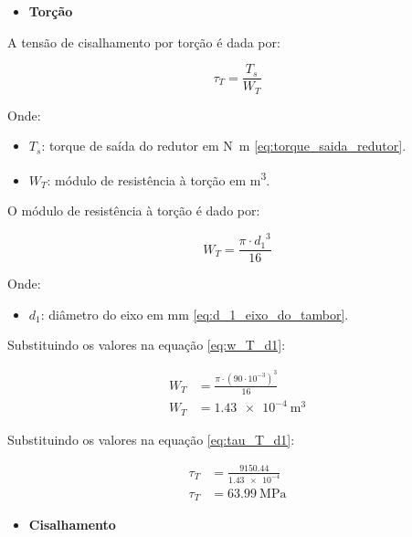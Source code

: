 \begin{itemize}
  \item \textbf{Torção}
\end{itemize}

A tensão de cisalhamento por torção é dada por:

\begin{equation}
  \tau_T = \frac{T_s}{W_T}
  \label{eq:tau_T_d1}
\end{equation}

Onde:

\begin{itemize}
  \item $T_s$: torque de saída do redutor em \si{\newton\meter} \eqref{eq:torque_saida_redutor}.
  \item $W_T$: módulo de resistência à torção em \si{\meter^3}.
\end{itemize}

\vspace{1em}

O módulo de resistência à torção é dado por:

\begin{equation}
  W_T = \frac{\pi \cdot {d_1}^3}{16}
  \label{eq:w_T_d1}
\end{equation}

Onde:

\begin{itemize}
  \item $d_1$: diâmetro do eixo em \si{\milli\meter} \eqref{eq:d_1_eixo_do_tambor}.
\end{itemize}

\vspace{1em}

Substituindo os valores na equação \eqref{eq:w_T_d1}:

\begin{align*}
  W_T & = \frac{\pi \cdot {\left( 90 \cdot 10^{-3} \right)}^3}{16} \\
  W_T & = \boxed{\SI{1.43e-4}{\meter^3}}
\end{align*}

Substituindo os valores na equação \eqref{eq:tau_T_d1}:

\begin{align*}
  \tau_T & = \frac{\num{9150.44}}{\num{1.43e-4}} \\
  \tau_T & = \boxed{\SI{63.99}{\mega\pascal}}
\end{align*}

\begin{itemize}
  \item \textbf{Cisalhamento}
\end{itemize}

